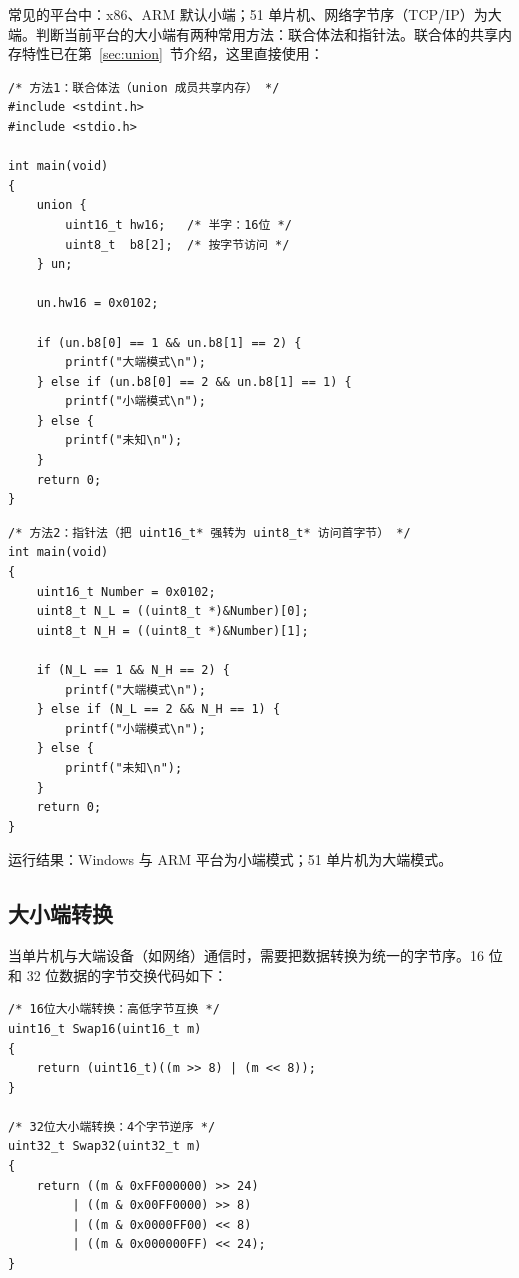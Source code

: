 常见的平台中：x86、ARM 默认小端；51 单片机、网络字节序（TCP/IP）为大端。判断当前平台的大小端有两种常用方法：联合体法和指针法。联合体的共享内存特性已在第~\ref{sec:union}~节介绍，这里直接使用：

\begin{lstlisting}[style=c]
/* 方法1：联合体法（union 成员共享内存） */
#include <stdint.h>
#include <stdio.h>

int main(void)
{
    union {
        uint16_t hw16;   /* 半字：16位 */
        uint8_t  b8[2];  /* 按字节访问 */
    } un;

    un.hw16 = 0x0102;

    if (un.b8[0] == 1 && un.b8[1] == 2) {
        printf("大端模式\n");
    } else if (un.b8[0] == 2 && un.b8[1] == 1) {
        printf("小端模式\n");
    } else {
        printf("未知\n");
    }
    return 0;
}
\end{lstlisting}

\begin{lstlisting}[style=c]
/* 方法2：指针法（把 uint16_t* 强转为 uint8_t* 访问首字节） */
int main(void)
{
    uint16_t Number = 0x0102;
    uint8_t N_L = ((uint8_t *)&Number)[0];
    uint8_t N_H = ((uint8_t *)&Number)[1];

    if (N_L == 1 && N_H == 2) {
        printf("大端模式\n");
    } else if (N_L == 2 && N_H == 1) {
        printf("小端模式\n");
    } else {
        printf("未知\n");
    }
    return 0;
}
\end{lstlisting}

运行结果：Windows 与 ARM 平台为小端模式；51 单片机为大端模式。

\subsection{大小端转换}

当单片机与大端设备（如网络）通信时，需要把数据转换为统一的字节序。16 位和 32 位数据的字节交换代码如下：

\begin{lstlisting}[style=c]
/* 16位大小端转换：高低字节互换 */
uint16_t Swap16(uint16_t m)
{
    return (uint16_t)((m >> 8) | (m << 8));
}

/* 32位大小端转换：4个字节逆序 */
uint32_t Swap32(uint32_t m)
{
    return ((m & 0xFF000000) >> 24)
         | ((m & 0x00FF0000) >> 8)
         | ((m & 0x0000FF00) << 8)
         | ((m & 0x000000FF) << 24);
}
\end{lstlisting}

